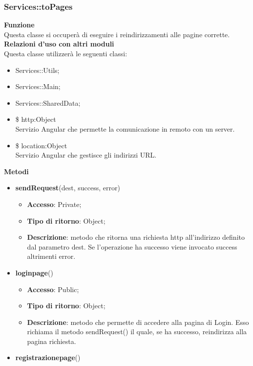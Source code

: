 \subsubsection{Services::toPages}{
		\label{sub:servicestoPages}
		\textbf{Funzione}\\
		\indent Questa classe si occuperà di eseguire i reindirizzamenti alle pagine corrette.\\
		\textbf{Relazioni d'uso con altri moduli}\\
		\indent Questa classe utilizzerà le seguenti classi:
		\begin{itemize}
			\item Services::Utils;
			\item Services::Main;
			\item Services::SharedData;
			\item \$ http:Object\\
				\indent Servizio Angular che permette la comunicazione in remoto con un server.
			\item \$ location:Object\\
				\indent Servizio Angular che gestisce gli indirizzi URL.
		\end{itemize}
		\textbf{Metodi}
		\begin{itemize}
			\item \textbf{sendRequest}(dest, success, error)
			\begin{itemize}
				\item \textbf{Accesso}: Private;
				\item \textbf{Tipo di ritorno}: Object;
				\item \textbf{Descrizione}: metodo che ritorna una richiesta http all'indirizzo definito dal parametro dest. Se l'operazione ha successo viene invocato success altrimenti error.
			\end{itemize}
			\item \textbf{loginpage}()
			\begin{itemize}
				\item \textbf{Accesso}: Public;
				\item \textbf{Tipo di ritorno}: Object;
				\item \textbf{Descrizione}: metodo che permette di accedere alla pagina di Login. Esso richiama il metodo sendRequest() il quale, se ha successo, reindirizza alla pagina richiesta.
			\end{itemize}
			\item \textbf{registrazionepage}()
			\begin{itemize}

\end{itemize}
\end{itemize}}
